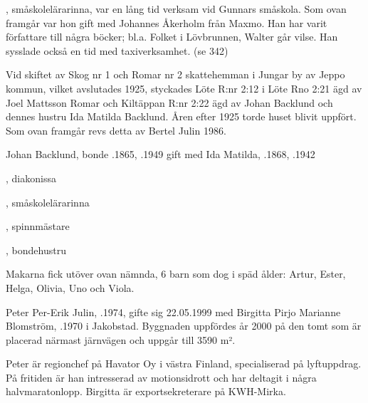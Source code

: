 , småskolelärarinna, var en lång tid verksam vid Gunnars småskola. Som ovan framgår var hon gift med Johannes Åkerholm från Maxmo. Han har varit författare till några böcker; bl.a. Folket i Lövbrunnen, Walter går vilse. Han sysslade också en tid med taxiverksamhet. (se 342)




Vid skiftet av Skog nr 1 och Romar nr 2 skattehemman i Jungar by av Jeppo kommun, vilket avslutades 1925, styckades Löte R:nr 2:12 i Löte Rno 2:21 ägd av Joel Mattsson Romar och Kiltäppan  R:nr 2:22 ägd av Johan Backlund och dennes hustru Ida Matilda Backlund. Åren efter 1925 torde huset blivit uppfört. Som ovan framgår revs detta av Bertel Julin 1986.

Johan Backlund, bonde .1865, .1949 gift med Ida Matilda, .1868, .1942
\begin{jhchildren}
  \item {}, diakonissa
  \item {}, småskolelärarinna
  \item {}, spinnmästare
  \item {}, bondehustru
  \item {}
\end{jhchildren}
Makarna fick utöver ovan nämnda, 6 barn som dog i späd ålder: Artur, Ester, Helga, Olivia, Uno och Viola.





Peter Per-Erik Julin, .1974, gifte sig 22.05.1999 med Birgitta Pirjo Marianne Blomström, .1970 i Jakobstad. Byggnaden uppfördes år 2000 på den tomt som är placerad närmast järnvägen och uppgår till 3590 m².

Peter är regionchef på Havator Oy i västra Finland, specialiserad på lyftuppdrag. På fritiden är han intresserad av motionsidrott och har deltagit i några halvmaratonlopp. Birgitta är exportsekreterare på KWH-Mirka.
\begin{jhchildren}
  \item {}
  \item {}
\end{jhchildren}



